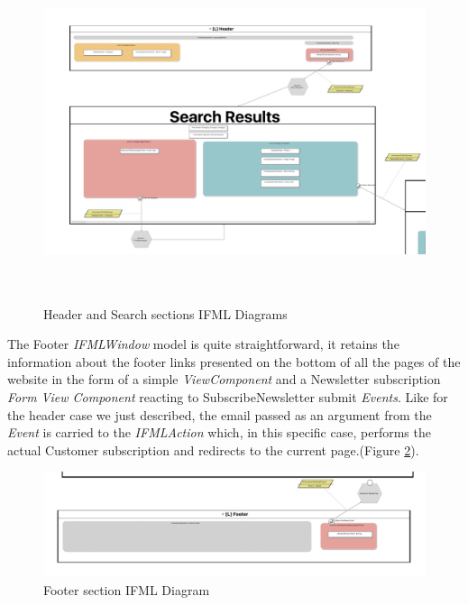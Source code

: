 \vspace{0.5cm}
\begin{figure}[H]
  \centering
    \includegraphics[height=10cm]{images/diagrams/before/ifml-header-search.png}
  \caption{Header and Search sections IFML Diagrams}
  \label{fig:ifml-before-header-search}
\end{figure}
\vspace{0.5cm}

The Footer \textit{IFMLWindow} model is quite straightforward, it retains the information about the footer links presented on the bottom of all the pages of the website in the form of a simple \textit{ViewComponent} and a Newsletter subscription \textit{Form View Component} reacting to SubscribeNewsletter submit \textit{Events}. Like for the header case we just described, the email passed as an argument from the \textit{Event} is carried to the \textit{IFMLAction} which, in this specific case, performs the actual Customer subscription and redirects to the current page.(Figure \ref{fig:ifml-before-footer}).

\vspace{0.5cm}
\begin{figure}[H]
  \centering
    \includegraphics[width=12cm]{images/diagrams/before/ifml-footer.png}
  \caption{Footer section IFML Diagram}
  \label{fig:ifml-before-footer}
\end{figure}
\vspace{0.5cm}

